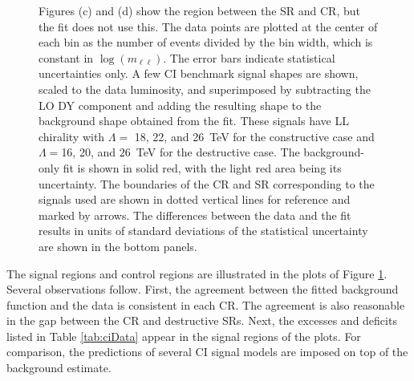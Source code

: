 {\begin{figure}[h!]
{Figures (c) and (d) show the region between the SR and CR, but the fit does not use this.
The data points are plotted at the center of each bin as the number of events divided by the bin width, which is constant in $\log{(m_{\ell\ell})}$.
The error bars indicate statistical uncertainties only.
A few CI benchmark signal shapes are shown, scaled to the data luminosity, and superimposed by subtracting the LO DY component and adding the resulting shape to the background shape obtained from the fit.
These signals have LL chirality with $\Lambda=$ 18, 22, and 26~TeV for the constructive case and $\Lambda=$16, 20, and $26$~TeV for the destructive case.
The background-only fit is shown in solid red, with the light red area being its uncertainty.
The boundaries of the CR and SR corresponding to the signals used are shown in dotted vertical lines for reference and marked by arrows.
The differences between the data and the fit results in units of standard deviations of the statistical uncertainty are shown in the bottom panels.
}
\label{fig:ciDist}
\end{figure}
\clearpage
}

The signal regions and control regions are illustrated in the plots of Figure \ref{fig:ciDist}.
Several observations follow.
First, the agreement between the fitted background function and the data is consistent in each CR.
The agreement is also reasonable in the gap between the CR and destructive SRs.
Next, the excesses and deficits listed in Table \ref{tab:ciData} appear in the signal regions of the plots.
For comparison, the predictions of several CI signal models are imposed on top of the background estimate.

